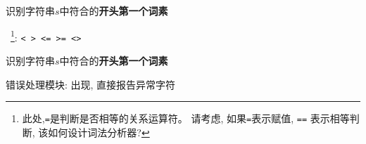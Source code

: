 \begin{frame}{}
  \begin{center}
    识别字符串$s$中符合的{\bf 开头第一个词素}

    \vspace{0.30cm}
    \relop~\footnote{此处,\texttt{=}是判断是否相等的关系运算符。
    请考虑, 如果\texttt{=}表示赋值, \texttt{==} 表示相等判断, 该如何设计词法分析器?}: 
    \texttt{< \quad > \quad <= \quad >= \quad \red{=} \quad <>}

    \pause
    \vspace{0.30cm}

    \pause
  \end{center}
\end{frame}

\begin{frame}{}
  \begin{center}
    识别字符串$s$中符合的{\bf 开头第一个词素}

    \vspace{0.60cm}

    \vspace{0.50cm}
    错误处理模块: 出现, 直接报告异常字符
  \end{center}
\end{frame}

